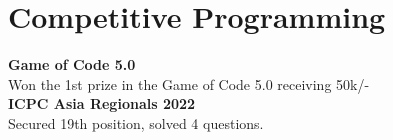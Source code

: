 \documentclass[]{m abbas resume' 2022}
\begin{document}
\begin{minipage}[t]{0.5\textwidth}

	\section{Competitive Programming}
	\textbf{Game of Code 5.0}\\
	Won the 1st prize in the Game of Code 5.0 receiving 50k/- \\
	\textbf{ICPC Asia Regionals 2022}\\
	Secured 19th position, solved 4 questions. \\



\end{minipage}
\hfill
\end{document}
